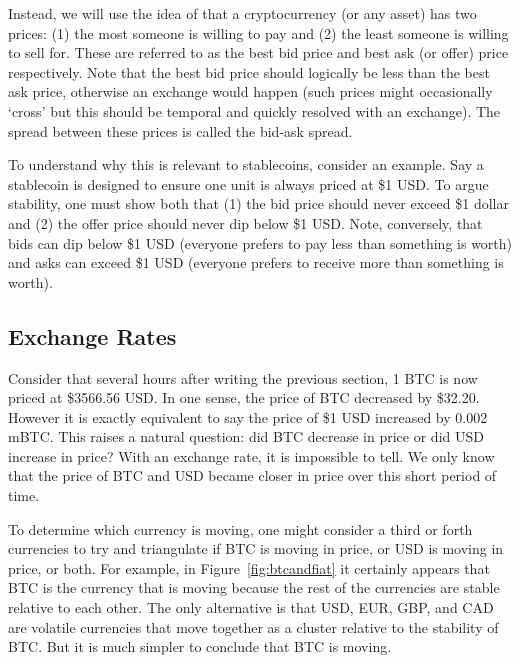 Instead, we will use the idea of that a cryptocurrency (or any asset) has two prices: (1) the most someone is willing to pay and (2) the least someone is willing to sell for. These are referred to as the best bid price and best ask (or offer) price respectively. Note that the best bid price should logically be less than the best ask price, otherwise an exchange would happen (such prices might occasionally `cross' but this should be temporal and quickly resolved with an exchange). The spread between these prices is called the bid-ask spread. 

To understand why this is relevant to stablecoins, consider an example. Say a stablecoin is designed to ensure one unit is always priced at \$1 USD. To argue stability, one must show both that (1) the bid price should never exceed \$1 dollar and (2) the offer price should never dip below \$1 USD. Note, conversely, that bids can dip below \$1 USD (everyone prefers to pay less than something is worth) and asks can exceed \$1 USD (everyone prefers to receive more than something is worth).

\subsection{Exchange Rates} 

Consider that several hours after writing the previous section, 1 BTC is now priced at \$3566.56 USD. In one sense, the price of BTC decreased by \$32.20. However it is exactly equivalent to say the price of \$1 USD increased by 0.002 mBTC. This raises a natural question: did BTC decrease in price or did USD increase in price? With an exchange rate, it is impossible to tell. We only know that the price of BTC and USD became closer in price over this short period of time.

To determine which currency is moving, one might consider a third or forth currencies to try and triangulate if BTC is moving in price, or USD is moving in price, or both. For example, in Figure~\ref{fig:btcandfiat} it certainly appears that BTC is the currency that is moving because the rest of the currencies are stable relative to each other. The only alternative is that USD, EUR, GBP, and CAD are volatile currencies that move together as a cluster relative to the stability of BTC. But it is much simpler to conclude that BTC is moving. 


